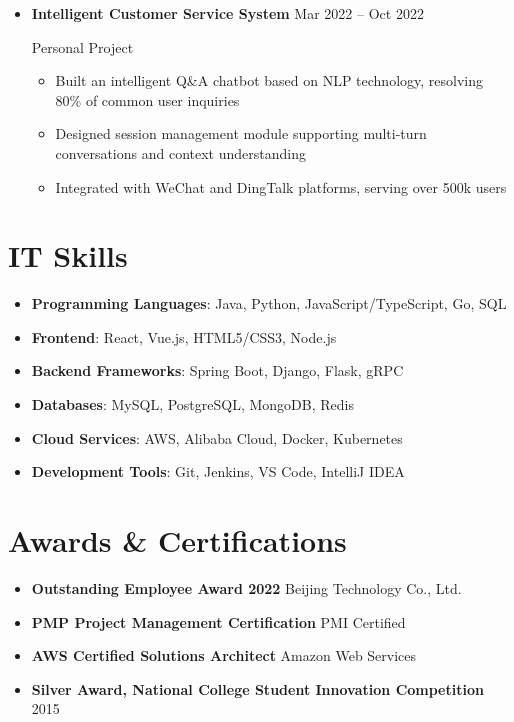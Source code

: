 \documentclass[11pt,a4paper]{article}
\begin{document}
\begin{itemize}
    \vspace{0.15em}

    \item \textbf{Intelligent Customer Service System} \hfill Mar 2022 -- Oct 2022

    \textcolor{primarycolor}{Personal Project}

    \begin{itemize}
        \item Built an intelligent Q\&A chatbot based on NLP technology, resolving 80\% of common user inquiries
        \item Designed session management module supporting multi-turn conversations and context understanding
        \item Integrated with WeChat and DingTalk platforms, serving over 500k users
    \end{itemize}
\end{itemize}

\section*{\faTools\quad IT Skills}

\begin{itemize}
    \item \textbf{Programming Languages}: Java, Python, JavaScript/TypeScript, Go, SQL
    \item \textbf{Frontend}: React, Vue.js, HTML5/CSS3, Node.js
    \item \textbf{Backend Frameworks}: Spring Boot, Django, Flask, gRPC
    \item \textbf{Databases}: MySQL, PostgreSQL, MongoDB, Redis
    \item \textbf{Cloud Services}: AWS, Alibaba Cloud, Docker, Kubernetes
    \item \textbf{Development Tools}: Git, Jenkins, VS Code, IntelliJ IDEA
\end{itemize}

\section*{\faAward\quad Awards \& Certifications}

\begin{itemize}
    \item \textbf{Outstanding Employee Award 2022} \hfill Beijing Technology Co., Ltd.
    \item \textbf{PMP Project Management Certification} \hfill PMI Certified
    \item \textbf{AWS Certified Solutions Architect} \hfill Amazon Web Services
    \item \textbf{Silver Award, National College Student Innovation Competition} \hfill 2015
\end{itemize}
\end{document}
